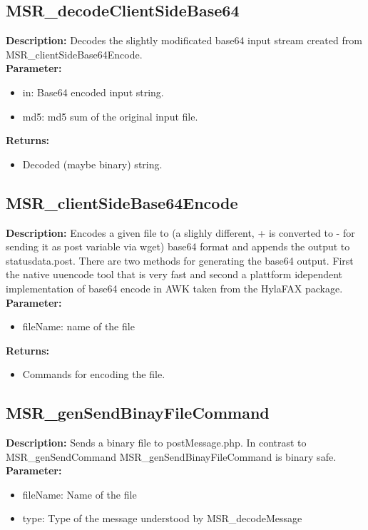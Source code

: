 \subsection{MSR\_decodeClientSideBase64}
\textbf{Description:} Decodes the slightly modificated base64 input stream created from MSR\_clientSideBase64Encode.\\
\textbf{Parameter:}
\begin{itemize}
\item in: Base64 encoded input string.
\item md5: md5 sum of the original input file.
\end{itemize}
\textbf{Returns:}
\begin{itemize}
\item Decoded (maybe binary) string.
\end{itemize}

\subsection{MSR\_clientSideBase64Encode}
\textbf{Description:} Encodes a given file to (a slighly different, + is converted to - for sending it as post variable via wget) base64 format and appends the output to statusdata.post. There are two methods for generating the base64 output. First the native uuencode tool that is very fast and second a plattform idependent implementation of base64 encode in AWK taken from the HylaFAX package.\\
\textbf{Parameter:}
\begin{itemize}
\item fileName: name of the file
\end{itemize}
\textbf{Returns:}
\begin{itemize}
\item Commands for encoding the file.
\end{itemize}

\subsection{MSR\_genSendBinayFileCommand}
\textbf{Description:} Sends a binary file to postMessage.php. In contrast to MSR\_genSendCommand MSR\_genSendBinayFileCommand is binary safe.\\
\textbf{Parameter:}
\begin{itemize}
\item fileName: Name of the file
\item type: Type of the message understood by MSR\_decodeMessage
\end{itemize}

